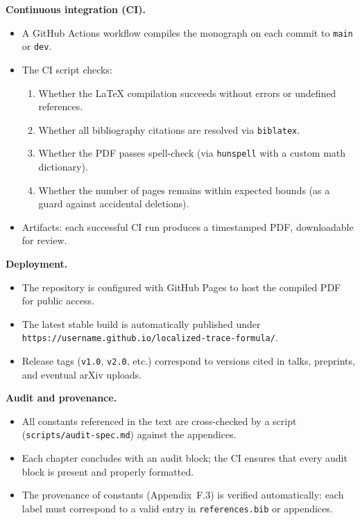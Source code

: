 \medskip
\noindent \textbf{Continuous integration (CI).}
\begin{itemize}
  \item A GitHub Actions workflow compiles the monograph on each commit to \texttt{main} or \texttt{dev}.
  \item The CI script checks:
    \begin{enumerate}
      \item Whether the \LaTeX{} compilation succeeds without errors or undefined references.
      \item Whether all bibliography citations are resolved via \texttt{biblatex}.
      \item Whether the PDF passes spell-check (via \texttt{hunspell} with a custom math dictionary).
      \item Whether the number of pages remains within expected bounds (as a guard against accidental deletions).
    \end{enumerate}
  \item Artifacts: each successful CI run produces a timestamped PDF, downloadable for review.
\end{itemize}

\medskip
\noindent \textbf{Deployment.}
\begin{itemize}
  \item The repository is configured with GitHub Pages to host the compiled PDF for public access.
  \item The latest stable build is automatically published under \texttt{https://username.github.io/localized-trace-formula/}.
  \item Release tags (\texttt{v1.0}, \texttt{v2.0}, etc.) correspond to versions cited in talks, preprints, and eventual arXiv uploads.
\end{itemize}

\medskip
\noindent \textbf{Audit and provenance.}
\begin{itemize}
  \item All constants referenced in the text are cross-checked by a script (\texttt{scripts/audit-spec.md}) against the appendices.
  \item Each chapter concludes with an audit block; the CI ensures that every audit block is present and properly formatted.
  \item The provenance of constants (Appendix~F.3) is verified automatically: each label must correspond to a valid entry in \texttt{references.bib} or appendices.
\end{itemize}


